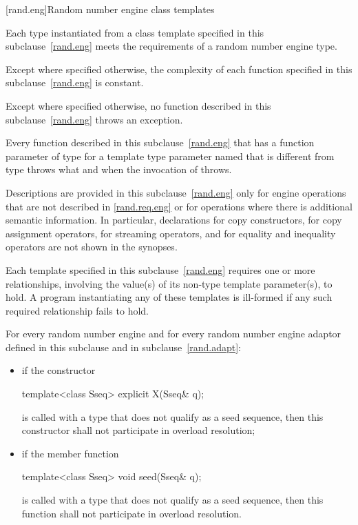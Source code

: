 [rand.eng]{Random number engine class templates}%

\pnum
Each type instantiated
from a class template specified in this subclause~\ref{rand.eng}
meets the requirements
of a random number engine type.

\pnum
Except where specified otherwise,
the complexity of each function
specified in this subclause~\ref{rand.eng}
is constant.

\pnum
Except where specified otherwise,
no function described in this subclause~\ref{rand.eng}
throws an exception.

\pnum
Every function described in this subclause~\ref{rand.eng}
that has a function parameter  of type 
for a template type parameter named 
that is different from type 
throws what and when the invocation of  throws.

\pnum
Descriptions are provided in this subclause~\ref{rand.eng}
only for engine operations
that are not described in \ref{rand.req.eng}
or for operations where there is additional semantic information.
In particular,
declarations for copy constructors,
for copy assignment operators,
for streaming operators,
and for equality and inequality operators
are not shown in the synopses.

\pnum
Each template specified in this subclause~\ref{rand.eng}
requires one or more relationships,
involving the value(s) of its non-type template parameter(s), to hold.
A program instantiating any of these templates
is ill-formed
if any such required relationship fails to hold.

\pnum
For every random number engine and for every random number engine adaptor 
defined in this subclause and in subclause~\ref{rand.adapt}:

\begin{itemize}
\item
if the constructor
\begin{codeblock}
template<class Sseq> explicit X(Sseq& q);
\end{codeblock}
is called with a type  that does not qualify as a seed sequence, then this
constructor shall not participate in overload resolution;

\item
if the member function
\begin{codeblock}
template<class Sseq> void seed(Sseq& q);
\end{codeblock}
is called with a type  that does not qualify as a seed sequence, then this
function shall not participate in overload resolution.
\end{itemize}

